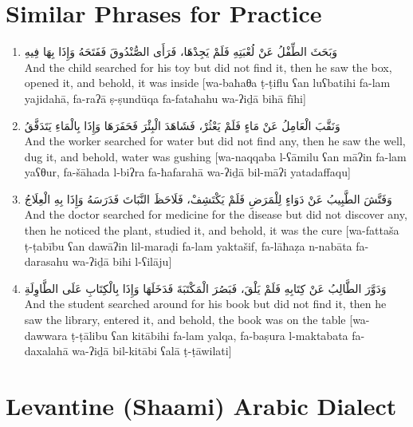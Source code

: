 \documentclass[letter,12pt]{article}
\begin{document}
\section{Similar Phrases for Practice}

\begin{enumerate}
\item \textarabic{وَبَحَثَ الطِّفْلُ عَنْ لُعْبَتِهِ فَلَمْ يَجِدْهَا، فَرَأَى الصُّنْدُوقَ فَفَتَحَهُ وَإِذَا بِهَا فِيهِ}\\
And the child searched for his toy but did not find it, then he saw the box, opened it, and behold, it was inside [wa-baħaθa ṭ-ṭiflu ʕan luʕbatihi fa-lam yajidahā, fa-raʔā ṣ-ṣundūqa fa-fataħahu wa-ʔiḏā bihā fīhi]

\item \textarabic{وَنَقَّبَ الْعَامِلُ عَنْ مَاءٍ فَلَمْ يَعْثُرْ، فَشَاهَدَ الْبِئْرَ فَحَفَرَهَا وَإِذَا بِالْمَاءِ يَتَدَفَّقُ}\\
And the worker searched for water but did not find any, then he saw the well, dug it, and behold, water was gushing [wa-naqqaba l-ʕāmilu ʕan māʔin fa-lam yaʕθur, fa-šāhada l-biʔra fa-ħafarahā wa-ʔiḏā bil-māʔi yatadaffaqu]

\item \textarabic{وَفَتَّشَ الطَّبِيبُ عَنْ دَوَاءٍ لِلْمَرَضِ فَلَمْ يَكْتَشِفْ، فَلَاحَظَ النَّبَاتَ فَدَرَسَهُ وَإِذَا بِهِ الْعِلَاجُ}\\
And the doctor searched for medicine for the disease but did not discover any, then he noticed the plant, studied it, and behold, it was the cure [wa-fattaša ṭ-ṭabību ʕan dawāʔin lil-maraḍi fa-lam yaktašif, fa-lāħaẓa n-nabāta fa-darasahu wa-ʔiḏā bihi l-ʕilāju]

\item \textarabic{وَدَوَّرَ الطَّالِبُ عَنْ كِتَابِهِ فَلَمْ يَلْقَ، فَبَصُرَ الْمَكْتَبَةَ فَدَخَلَهَا وَإِذَا بِالْكِتَابِ عَلَى الطَّاوِلَةِ}\\
And the student searched around for his book but did not find it, then he saw the library, entered it, and behold, the book was on the table [wa-dawwara ṭ-ṭālibu ʕan kitābihi fa-lam yalqa, fa-baṣura l-maktabata fa-daxalahā wa-ʔiḏā bil-kitābi ʕalā ṭ-ṭāwilati]
\end{enumerate}

\section{Levantine (Shaami) Arabic Dialect}
\end{document}
